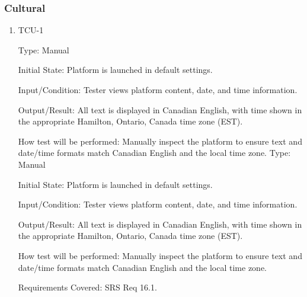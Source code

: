 \documentclass[12pt, titlepage]{article}
\begin{document}
\subsubsection{Cultural}

\begin{enumerate}

  \item{TCU-1\\}

        Type: Manual

        Initial State: Platform is launched in default settings.

        Input/Condition: Tester views platform content, date, and time information.

        Output/Result: All text is displayed in Canadian English, with time shown in the appropriate Hamilton, Ontario, Canada time zone (EST).

        How test will be performed: Manually inspect the platform to ensure text and date/time formats match Canadian English and the local time zone.
Type: Manual
					
Initial State: Platform is launched in default settings.
					
Input/Condition: Tester views platform content, date, and time information.
					
Output/Result: All text is displayed in Canadian English, with time shown in the appropriate Hamilton, Ontario, Canada time zone (EST).
					
How test will be performed: Manually inspect the platform to ensure text and date/time formats match Canadian English and the local time zone.

Requirements Covered: SRS Req 16.1.

\end{enumerate}
\end{document}
